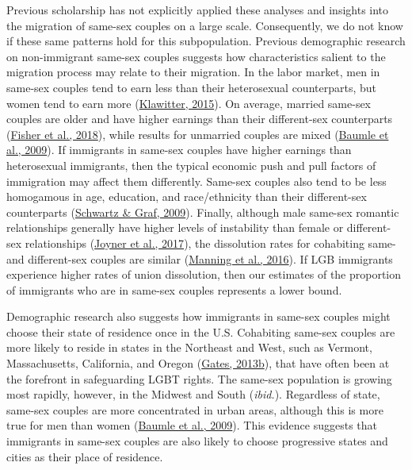 \documentclass[
  11pt,
]{article}
\begin{document}
Previous scholarship has not explicitly applied these analyses and insights into the migration of same-sex couples on a large scale. Consequently, we do not know if these same patterns hold for this subpopulation. Previous demographic research on non-immigrant same-sex couples suggests how characteristics salient to the migration process may relate to their migration. In the labor market, men in same-sex couples tend to earn less than their heterosexual counterparts, but women tend to earn more (\protect\hyperlink{ref-klawitter_2015}{Klawitter, 2015}). On average, married same-sex couples are older and have higher earnings than their different-sex counterparts (\protect\hyperlink{ref-fisher_2018}{Fisher et al., 2018}), while results for unmarried couples are mixed (\protect\hyperlink{ref-baumle_2009}{Baumle et al., 2009}). If immigrants in same-sex couples have higher earnings than heterosexual immigrants, then the typical economic push and pull factors of immigration may affect them differently. Same-sex couples also tend to be less homogamous in age, education, and race/ethnicity than their different-sex counterparts (\protect\hyperlink{ref-schwartz_2009}{Schwartz \& Graf, 2009}). Finally, although male same-sex romantic relationships generally have higher levels of instability than female or different-sex relationships (\protect\hyperlink{ref-joyner_2017}{Joyner et al., 2017}), the dissolution rates for cohabiting same- and different-sex couples are similar (\protect\hyperlink{ref-manning_2016}{Manning et al., 2016}). If LGB immigrants experience higher rates of union dissolution, then our estimates of the proportion of immigrants who are in same-sex couples represents a lower bound.

Demographic research also suggests how immigrants in same-sex couples might choose their state of residence once in the U.S. Cohabiting same-sex couples are more likely to reside in states in the Northeast and West, such as Vermont, Massachusetts, California, and Oregon (\protect\hyperlink{ref-gates_2013a}{Gates, 2013b}), that have often been at the forefront in safeguarding LGBT rights. The same-sex population is growing most rapidly, however, in the Midwest and South (\emph{ibid.}). Regardless of state, same-sex couples are more concentrated in urban areas, although this is more true for men than women (\protect\hyperlink{ref-baumle_2009}{Baumle et al., 2009}). This evidence suggests that immigrants in same-sex couples are also likely to choose progressive states and cities as their place of residence.
\end{document}
